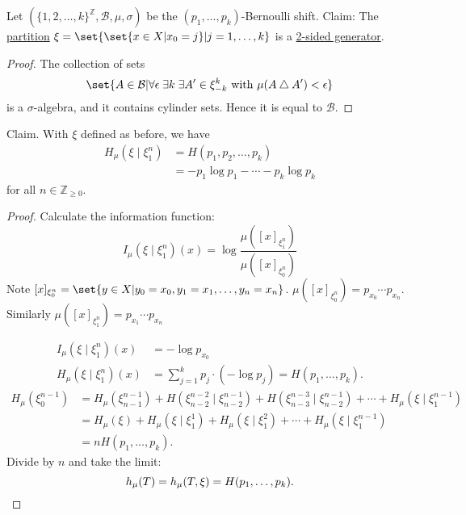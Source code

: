 \documentclass{article}
\newcommand{\sym}{\bigtriangleup}
\begin{document}
\color{gray}
Let $(\{1,2,\dotsc,k\}^\mathbb{Z}, \mathcal{B},\mu,\sigma)$ be the $(p_1, \dotsc, p_k)$-Bernoulli shift.
Claim:
The \hyperlink{def:partition}{partition} $\xi = \set{\set{x \in X | x_0 = j} | j = 1, \dotsc, k}$ is a \hyperlink{def:gen}{2-sided generator}.
\begin{proof}
  The collection of sets
  \begin{equation*}
    \set{A \in \mathcal{B} | \forall \epsilon \; \exists k \; \exists A' \in \xi_{-k}^k \text{ with } \mu(A \sym A') < \epsilon}
  \end{equation*}
  is a $\sigma$-algebra, and it contains cylinder sets. Hence it is equal to $\mathcal{B}$.
\end{proof}
Claim. With $\xi$ defined as before, we have
\begin{align*}
  H_\mu(\xi \mid \xi_1^n) &= H(p_1, p_2, \dotsc, p_k) \\
                          &= -p_1 \log p_1 - \dotsb - p_k \log p_k
\end{align*}
for all $n \in \mathbb{Z}_{\geq 0}$.
\begin{proof}
  Calculate the information function:
  \begin{equation*}
    I_\mu(\xi \mid \xi_1^n)(x) = \log \frac{\mu([x]_{\xi_1^n})}{\mu([x]_{\xi_0^n})}
  \end{equation*}
  Note
  $[x]_{\xi_0^n} = \set{y \in X | y_0 = x_0 , y_1 = x_1, \dotsc, y_n = x_n}$.
  $\mu([x]_{\xi_0^n}) = p_{x_0} \dotsm p_{x_n}$. Similarly $\mu([x]_{\xi_1^n}) = p_{x_1} \dotsm p_{x_n}$

  \begin{align*}
    I_\mu(\xi \mid \xi_1^n)(x) &= -\log p_{x_0} \\
    H_\mu(\xi \mid \xi_1^n)(x) &= \sum_{j=1}^k p_j \cdot (-\log p_j) = H(p_1, \dotsc, p_k).
  \end{align*}
  \begin{align*}
    H_\mu(\xi_0^{n-1}) &= H_\mu(\xi_{n-1}^{n-1}) + H(\xi_{n-2}^{n-2} \mid \xi_{n-2}^{n-1}) + H(\xi_{n-3}^{n-3} \mid \xi_{n-2}^{n-1}) + \dotsb + H_\mu(\xi \mid \xi_1^{n-1}) \\
                       &= H_\mu(\xi) + H_\mu(\xi \mid \xi_1^1) + H_\mu(\xi \mid \xi_1^2) + \dotsb + H_\mu(\xi \mid \xi_1^{n-1}) \\
                       &= n H(p_1, \dotsc, p_k).
  \end{align*}
  Divide by $n$ and take the limit:
  \begin{equation*}
    h_\mu(T) = h_\mu(T, \xi) = H(p_1, \dotsc, p_k). \qedhere
  \end{equation*}
\end{proof}
\end{document}
